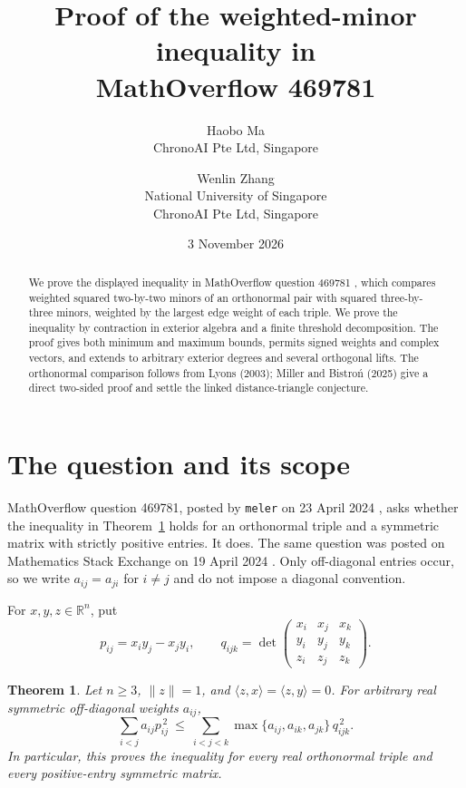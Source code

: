 \documentclass[11pt]{article}
\title{Proof of the weighted-minor inequality in\\MathOverflow 469781}
\author{Haobo Ma\\\small ChronoAI Pte Ltd, Singapore
\and Wenlin Zhang\\\small National University of Singapore\\\small ChronoAI Pte Ltd, Singapore}
\date{3 November 2026}
\newtheorem{theorem}{Theorem}
\newcommand{\R}{\mathbb{R}}
\begin{document}
\maketitle
\begin{abstract}
We prove the displayed inequality in MathOverflow question 469781 \cite{mo},
which compares weighted squared
two-by-two minors of an orthonormal pair with squared three-by-three minors,
weighted by the largest edge weight of each triple. We prove the inequality
by contraction in exterior algebra and a finite threshold decomposition.
The proof gives both minimum and maximum bounds, permits signed weights and
complex vectors, and extends to arbitrary exterior degrees and several
orthogonal lifts. The orthonormal comparison follows from Lyons (2003);
Miller and Bistro\'n (2025) give a direct two-sided proof and settle the
linked distance-triangle conjecture.
\end{abstract}

\section{The question and its scope}
MathOverflow question 469781, posted by \texttt{meler} on 23 April 2024
\cite{mo}, asks whether the inequality in Theorem~\ref{thm:main} holds for
an orthonormal triple and a symmetric matrix with strictly positive entries.
It does. The same question was posted on Mathematics Stack Exchange on
19 April 2024 \cite{mse}. Only off-diagonal entries occur, so we write
$a_{ij}=a_{ji}$ for $i\ne j$ and do not impose a diagonal convention.

For $x,y,z\in\R^n$, put
\[
 p_{ij}=x_i y_j-x_j y_i,\qquad
 q_{ijk}=\det\begin{pmatrix}x_i&x_j&x_k\\y_i&y_j&y_k\\z_i&z_j&z_k\end{pmatrix}.
\]
\begin{theorem}\label{thm:main}
Let $n\ge3$, $\|z\|=1$, and $\langle z,x\rangle=\langle z,y\rangle=0$.
For arbitrary real symmetric off-diagonal weights $a_{ij}$,
\begin{equation}\label{eq:main}
 \sum_{i<j}a_{ij}p_{ij}^{\,2}
 \ \le\ \sum_{i<j<k}\max\{a_{ij},a_{ik},a_{jk}\}\,q_{ijk}^{\,2}.
\end{equation}
In particular, this proves the inequality for every real orthonormal triple
and every positive-entry symmetric matrix.
\end{theorem}
\end{document}
